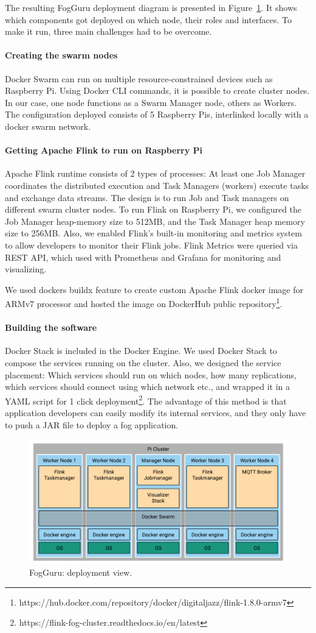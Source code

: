 The resulting FogGuru deployment diagram is presented in Figure~\ref{fig:deployment}. It shows which components got deployed on which node, their roles and interfaces. To make it run, three main challenges had to be overcome.

\paragraph*{Creating the swarm nodes}
Docker Swarm can run on multiple resource-constrained devices such as Raspberry Pi. Using Docker CLI commands, it is possible to create cluster nodes. In our case, one node functions as a Swarm Manager node, others as Workers. The configuration deployed consists of 5 Raspberry Pis, interlinked locally with a docker swarm network.

\paragraph*{Getting Apache Flink to run on Raspberry Pi}
Apache Flink runtime consists of 2 types of processes: At least one Job Manager coordinates the distributed execution and Task Managers (workers) execute tasks and exchange data streams. The design is to run Job and Task managers on different swarm cluster nodes. To run Flink on Raspberry Pi, we configured the Job Manager heap-memory size to 512MB, and the Task Manager heap memory size to 256MB. Also, we enabled Flink's built-in monitoring and metrics system to allow developers to monitor their Flink jobs. Flink Metrics were queried via REST API, which used with Prometheus and Grafana for monitoring and visualizing.

We used dockers buildx feature to create custom Apache Flink docker image for ARMv7 processor and hosted the image on DockerHub public repository\footnote{https://hub.docker.com/repository/docker/digitaljazz/flink-1.8.0-armv7}.

\paragraph*{Building the software}
Docker Stack is included in the Docker Engine. We used Docker Stack to compose the services running on the cluster. Also, we designed the service placement: Which services should run on which nodes, how many replications, which services should connect using which network etc., and wrapped it in a YAML script for 1 click deployment\footnote{https://flink-fog-cluster.readthedocs.io/en/latest}. The advantage of this method is that application developers can easily modify its internal services, and they only have to push a JAR file to deploy a fog application.

\begin{figure}[htbp]
\centerline{
\includegraphics[width=1\linewidth]{figures/fog_platform.pdf}}
\caption{FogGuru: deployment view.}
\label{fig:deployment}
\end{figure}
